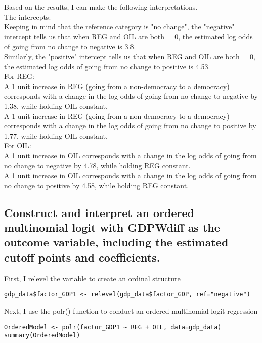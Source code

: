\documentclass{article}
\begin{document}
Based on the results, I can make the following interpretations.
\\
The intercepts:
\\
Keeping in mind that the reference category is "no change", the "negative" intercept tells us that when REG and OIL are both = 0, the estimated log odds of going from no change to negative is 3.8. 
\\
Similarly, the "positive" intercept tells us that when REG and OIL are both = 0, the estimated log odds of going from no change to positive is 4.53. 
\\
For REG:
\\
A 1 unit increase in REG (going from a non-democracy to a democracy) corresponds with a change in the log odds of going from no change to negative by 1.38, while holding OIL constant. 
\\
A 1 unit increase in REG (going from a non-democracy to a democracy) corresponds with a change in the log odds of going from no change to positive by 1.77, while holding OIL constant.
\\
For OIL:
\\
A 1 unit increase in OIL corresponds with a change in the log odds of going from no change to negative by 4.78, while holding REG constant. 
\\
A 1 unit increase in OIL corresponds with a change in the log odds of going from no change to positive by 4.58, while holding REG constant.

\subsection{Construct and interpret an ordered multinomial logit with GDPWdiff as the outcome
variable, including the estimated cutoff points and coefficients.}

First, I relevel the variable to create an ordinal structure
\begin{verbatim}
gdp_data$factor_GDP1 <- relevel(gdp_data$factor_GDP, ref="negative")
\end{verbatim}

Next, I use the polr() function to conduct an ordered multinomial logit regression
\begin{verbatim}
OrderedModel <- polr(factor_GDP1 ~ REG + OIL, data=gdp_data)
summary(OrderedModel)
\end{verbatim}
\end{document}
